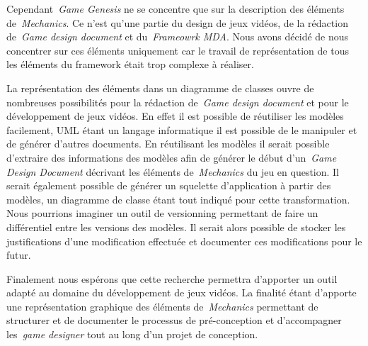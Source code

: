 \begin{conclusion}
Cependant~\emph{Game Genesis} ne se concentre que sur la description des éléments de~\emph{Mechanics}.
Ce n'est qu'une partie du design de jeux vidéos, de la rédaction de~\emph{Game design document} et du~\emph{Frameowrk MDA}.
Nous avons décidé de nous concentrer sur ces éléments uniquement car le travail de représentation de tous les éléments du framework était trop complexe à réaliser.

La représentation des éléments dans un diagramme de classes ouvre de nombreuses possibilités pour la rédaction de~\emph{Game design document} et pour le développement de jeux vidéos.
En effet il est possible de réutiliser les modèles facilement, UML étant un langage informatique il est possible de le manipuler et de générer d'autres documents.
En réutilisant les modèles il serait possible d'extraire des informations des modèles afin de générer le début d'un~\emph{Game Design Document} décrivant les éléments de~\emph{Mechanics} du jeu en question.
Il serait également possible de générer un squelette d'application à partir des modèles, un diagramme de classe étant tout indiqué pour cette transformation.
Nous pourrions imaginer un outil de versionning permettant de faire un différentiel entre les versions des modèles.
Il serait alors possible de stocker les justifications d'une modification effectuée et documenter ces modifications pour le futur.

Finalement nous espérons que cette recherche permettra d'apporter un outil adapté au domaine du développement de jeux vidéos. La finalité étant d'apporte une représentation graphique des éléments de~\emph{Mechanics} permettant de structurer et de documenter le processus de pré-conception et d'accompagner les~\emph{game designer} tout au long d'un projet de conception.




\end{conclusion}


